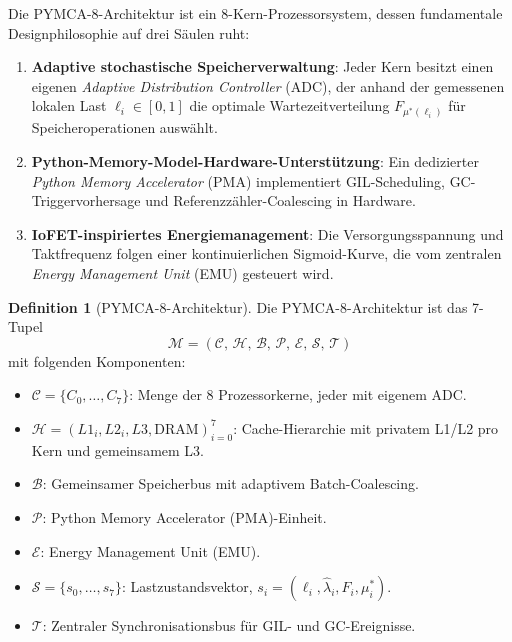 ﻿\documentclass[a4paper,12pt]{scrreprt}
\theoremstyle{definition}
\newtheorem{definition}{Definition}[section]
\begin{document}
	Die PYMCA-8-Architektur ist ein 8-Kern-Prozessorsystem, dessen
	fundamentale Designphilosophie auf drei Säulen ruht:
	
	\begin{enumerate}[noitemsep]
		\item \textbf{Adaptive stochastische Speicherverwaltung}: Jeder Kern besitzt
		einen eigenen \emph{Adaptive Distribution Controller} (ADC), der
		anhand der gemessenen lokalen Last $\ell_i \in [0,1]$ die optimale
		Wartezeitverteilung $F_{\mu^*(\ell_i)}$ für Speicheroperationen
		auswählt.
		\item \textbf{Python-Memory-Model-Hardware-Unterstützung}: Ein dedizierter
		\emph{Python Memory Accelerator} (PMA) implementiert GIL-Scheduling,
		GC-Triggervorhersage und Referenzzähler-Coalescing in Hardware.
		\item \textbf{IoFET-inspiriertes Energiemanagement}: Die Versorgungsspannung
		und Taktfrequenz folgen einer kontinuierlichen Sigmoid-Kurve, die
		vom zentralen \emph{Energy Management Unit} (EMU) gesteuert wird.
	\end{enumerate}
	
	\begin{definition}[PYMCA-8-Architektur]
		\label{def:pymca8}
		Die PYMCA-8-Architektur ist das 7-Tupel
		\[
		\mathcal{M} = \left(\mathcal{C},\, \mathcal{H},\, \mathcal{B},\,
		\mathcal{P},\, \mathcal{E},\, \mathcal{S},\,
		\mathcal{T}\right)
		\]
		mit folgenden Komponenten:
		\begin{itemize}[noitemsep]
			\item $\mathcal{C} = \{C_0, \ldots, C_7\}$: Menge der 8 Prozessorkerne,
			jeder mit eigenem ADC.
			\item $\mathcal{H} = (L1_i, L2_i, L3, \mathrm{DRAM})_{i=0}^{7}$:
			Cache-Hierarchie mit privatem L1/L2 pro Kern und gemeinsamem L3.
			\item $\mathcal{B}$: Gemeinsamer Speicherbus mit adaptivem
			Batch-Coalescing.
			\item $\mathcal{P}$: Python Memory Accelerator (PMA)-Einheit.
			\item $\mathcal{E}$: Energy Management Unit (EMU).
			\item $\mathcal{S} = \{s_0, \ldots, s_7\}$: Lastzustandsvektor,
			$s_i = (\ell_i, \hat\lambda_i, F_i, \mu_i^*)$.
			\item $\mathcal{T}$: Zentraler Synchronisationsbus für GIL- und
			GC-Ereignisse.
		\end{itemize}
	\end{definition}
	
\end{document}
